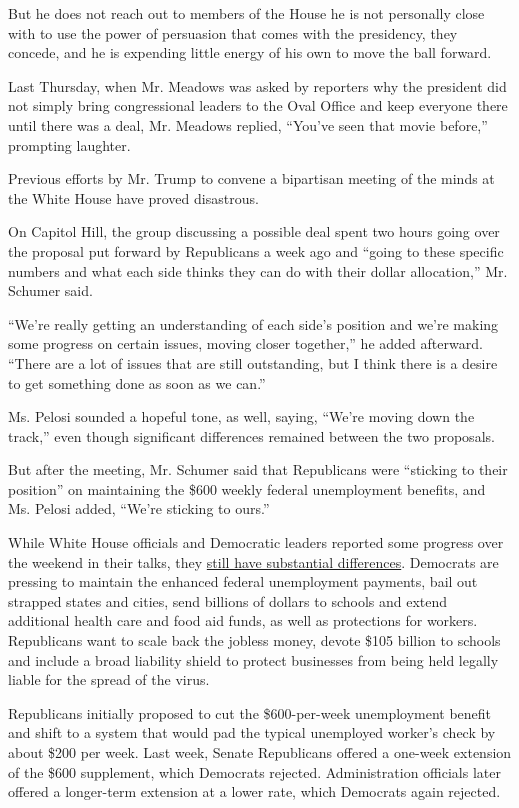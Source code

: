 But he does not reach out to members of the House he is not personally
close with to use the power of persuasion that comes with the
presidency, they concede, and he is expending little energy of his own
to move the ball forward.

Last Thursday, when Mr. Meadows was asked by reporters why the president
did not simply bring congressional leaders to the Oval Office and keep
everyone there until there was a deal, Mr. Meadows replied, ``You've
seen that movie before,'' prompting laughter.

Previous efforts by Mr. Trump to convene a bipartisan meeting of the
minds at the White House have proved disastrous.

On Capitol Hill, the group discussing a possible deal spent two hours
going over the proposal put forward by Republicans a week ago and
``going to these specific numbers and what each side thinks they can do
with their dollar allocation,'' Mr. Schumer said.

``We're really getting an understanding of each side's position and
we're making some progress on certain issues, moving closer together,''
he added afterward. ``There are a lot of issues that are still
outstanding, but I think there is a desire to get something done as soon
as we can.''

Ms. Pelosi sounded a hopeful tone, as well, saying, ``We're moving down
the track,'' even though significant differences remained between the
two proposals.

But after the meeting, Mr. Schumer said that Republicans were ``sticking
to their position'' on maintaining the \$600 weekly federal unemployment
benefits, and Ms. Pelosi added, ``We're sticking to ours.''

While White House officials and Democratic leaders reported some
progress over the weekend in their talks, they
\href{https://www.nytimes.com/2020/08/02/us/politics/coronavirus-jobless-aid.html}{still
have substantial differences}. Democrats are pressing to maintain the
enhanced federal unemployment payments, bail out strapped states and
cities, send billions of dollars to schools and extend additional health
care and food aid funds, as well as protections for workers. Republicans
want to scale back the jobless money, devote \$105 billion to schools
and include a broad liability shield to protect businesses from being
held legally liable for the spread of the virus.

Republicans initially proposed to cut the \$600-per-week unemployment
benefit and shift to a system that would pad the typical unemployed
worker's check by about \$200 per week. Last week, Senate Republicans
offered a one-week extension of the \$600 supplement, which Democrats
rejected. Administration officials later offered a longer-term extension
at a lower rate, which Democrats again rejected.

